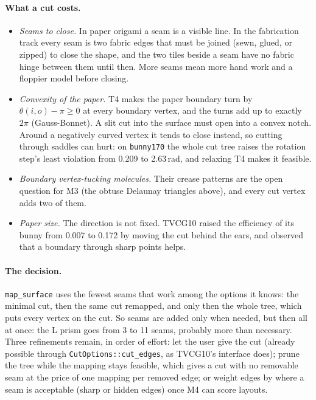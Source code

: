 \documentclass[11pt]{article}
\theoremstyle{definition}
\begin{document}
\paragraph{What a cut costs.}
\begin{itemize}[nosep]
  \item \emph{Seams to close.} In paper origami a seam is a visible line. In
    the fabrication track every seam is two fabric edges that must be joined
    (sewn, glued, or zipped) to close the shape, and the two tiles beside a
    seam have no fabric hinge between them until then. More seams mean more
    hand work and a floppier model before closing.
  \item \emph{Convexity of the paper.} T4 makes the paper boundary turn by
    $\theta(i,o) - \pi \ge 0$ at every boundary vertex, and the turns add up to
    exactly $2\pi$ (Gauss-Bonnet). A slit cut into the surface must open into
    a convex notch. Around a negatively curved vertex it tends to close
    instead, so cutting through saddles can hurt: on \texttt{bunny170} the
    whole cut tree raises the rotation step's least violation from 0.209 to
    2.63\,rad, and relaxing T4 makes it feasible.
  \item \emph{Boundary vertex-tucking molecules.} Their crease patterns are
    the open question for M3 (the obtuse Delaunay triangles above), and every
    cut vertex adds two of them.
  \item \emph{Paper size.} The direction is not fixed. TVCG10 raised the
    efficiency of its bunny from 0.007 to 0.172 by moving the cut behind the
    ears, and observed that a boundary through sharp points helps.
\end{itemize}

\paragraph{The decision.} \texttt{map\_surface} uses the fewest seams that
work among the options it knows: the minimal cut, then the same cut
remapped, and only then the whole tree, which puts every vertex on the cut.
So seams are added only when needed, but then all at once: the L prism goes
from 3 to 11 seams, probably more than necessary. Three refinements remain,
in order of effort: let the user give the cut (already possible through
\texttt{CutOptions::cut\_edges}, as TVCG10's interface does); prune the tree
while the mapping stays feasible, which gives a cut with no removable seam at
the price of one mapping per removed edge; or weight edges by where a seam is
acceptable (sharp or hidden edges) once M4 can score layouts.
\end{document}
